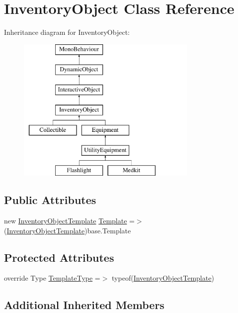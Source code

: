 \hypertarget{class_inventory_object}{}\section{Inventory\+Object Class Reference}
\label{class_inventory_object}
Inheritance diagram for Inventory\+Object\+:\begin{figure}[H]
\begin{center}
\leavevmode
\includegraphics[height=7.000000cm]{class_inventory_object}
\end{center}
\end{figure}
\subsection*{Public Attributes}
\begin{DoxyCompactItemize}
\item 
new \mbox{\hyperlink{class_inventory_object_template}{Inventory\+Object\+Template}} \mbox{\hyperlink{class_inventory_object_a977119b3dcb32a34cbd0ee72fba31f6b}{Template}} =$>$ (\mbox{\hyperlink{class_inventory_object_template}{Inventory\+Object\+Template}})base.\+Template
\end{DoxyCompactItemize}
\subsection*{Protected Attributes}
\begin{DoxyCompactItemize}
\item 
override Type \mbox{\hyperlink{class_inventory_object_a5b0f2109da22d83062365786fabf25c5}{Template\+Type}} =$>$ typeof(\mbox{\hyperlink{class_inventory_object_template}{Inventory\+Object\+Template}})
\end{DoxyCompactItemize}
\subsection*{Additional Inherited Members}


